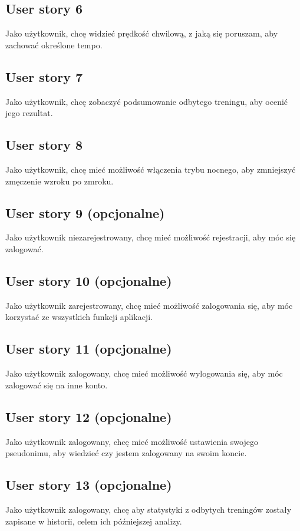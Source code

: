 \documentclass[a4paper]{article}
\begin{document}
\subsection{User story 6}
Jako użytkownik, chcę widzieć prędkość chwilową, z jaką się poruszam, aby zachować określone tempo.

\subsection{User story 7}
Jako użytkownik, chcę zobaczyć podsumowanie odbytego treningu, aby ocenić jego rezultat.

\subsection{User story 8}
Jako użytkownik, chcę mieć możliwość włączenia trybu nocnego, aby zmniejszyć zmęczenie wzroku po zmroku.

\subsection{User story 9 (opcjonalne)}
Jako użytkownik niezarejestrowany, chcę mieć możliwość rejestracji, aby móc się zalogować.

\subsection{User story 10 (opcjonalne)}
Jako użytkownik zarejestrowany, chcę mieć możliwość zalogowania się, aby móc korzystać ze wszystkich funkcji aplikacji.

\subsection{User story 11 (opcjonalne)}
Jako użytkownik zalogowany, chcę mieć możliwość wylogowania się, aby móc zalogować się na inne konto.

\subsection{User story 12 (opcjonalne)}
Jako użytkownik zalogowany, chcę mieć możliwość ustawienia swojego pseudonimu, aby wiedzieć czy jestem zalogowany na swoim koncie.

\subsection{User story 13 (opcjonalne)}
Jako użytkownik zalogowany, chcę aby statystyki z odbytych treningów zostały zapisane w historii, celem ich późniejszej analizy.
\end{document}
